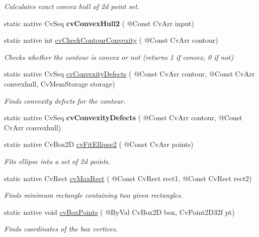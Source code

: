 \begin{DoxyCompactItemize}
\begin{DoxyCompactList}\small\item\em Calculates exact convex hull of 2d point set. \end{DoxyCompactList}\item 
static native Cv\+Seq {\bfseries cv\+Convex\+Hull2} ( @Const Cv\+Arr input)
\item 
static native int \hyperlink{group__imgproc__c_ga178a23955341ae86d5a45b1e1c71f7f7}{cv\+Check\+Contour\+Convexity} ( @Const Cv\+Arr contour)
\begin{DoxyCompactList}\small\item\em Checks whether the contour is convex or not (returns 1 if convex, 0 if not) \end{DoxyCompactList}\item 
static native Cv\+Seq \hyperlink{group__imgproc__c_ga186461d20f3b430d538560470ed76ea1}{cv\+Convexity\+Defects} ( @Const Cv\+Arr contour, @Const Cv\+Arr convexhull, Cv\+Mem\+Storage storage)
\begin{DoxyCompactList}\small\item\em Finds convexity defects for the contour. \end{DoxyCompactList}\item 
static native Cv\+Seq {\bfseries cv\+Convexity\+Defects} ( @Const Cv\+Arr contour, @Const Cv\+Arr convexhull)
\item 
static native Cv\+Box2D \hyperlink{group__imgproc__c_ga417295a4b5e1071f6af64972132cecac}{cv\+Fit\+Ellipse2} ( @Const Cv\+Arr points)
\begin{DoxyCompactList}\small\item\em Fits ellipse into a set of 2d points. \end{DoxyCompactList}\item 
static native Cv\+Rect \hyperlink{group__imgproc__c_ga3861a1015ad4bb47dd5ac88cf57b9cde}{cv\+Max\+Rect} ( @Const Cv\+Rect rect1, @Const Cv\+Rect rect2)
\begin{DoxyCompactList}\small\item\em Finds minimum rectangle containing two given rectangles. \end{DoxyCompactList}\item 
static native void \hyperlink{group__imgproc__c_ga9832ef1547e4d1a64768e2d09aefa8ce}{cv\+Box\+Points} ( @By\+Val Cv\+Box2D box, Cv\+Point2\+D32f pt)
\begin{DoxyCompactList}\small\item\em Finds coordinates of the box vertices. \end{DoxyCompactList}\item 

\end{DoxyCompactItemize}
